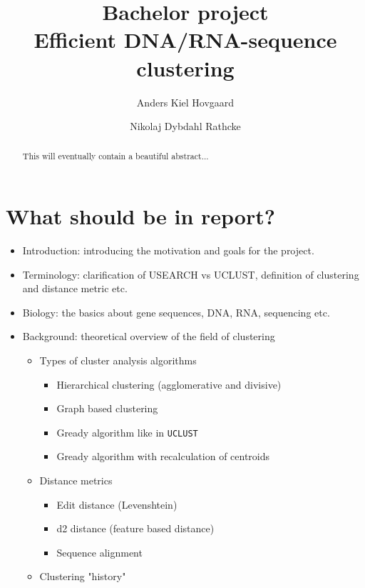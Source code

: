 \documentclass[11pt,a4paper]{article}
\title{Bachelor project \\
       \vspace{2mm}
       {\LARGE Efficient DNA/RNA-sequence clustering}}
\author{Anders Kiel Hovgaard \and Nikolaj Dybdahl Rathcke}
\begin{document}
\maketitle
\thispagestyle{fancy}

\begin{abstract}
  This will eventually contain a beautiful abstract...
\end{abstract}

\section{What should be in report?}

\begin{itemize}
  \item Introduction: introducing the motivation and goals for the project.
    
  \item Terminology: clarification of USEARCH vs UCLUST, definition of
    clustering and distance metric etc.

  \item Biology: the basics about gene sequences, DNA, RNA, sequencing etc.

  \item Background: theoretical overview of the field of clustering
    \begin{itemize}
      \item Types of cluster analysis algorithms
        \begin{itemize}
          \item Hierarchical clustering (agglomerative and divisive)
          \item Graph based clustering
          \item Gready algorithm like in \texttt{UCLUST}
          \item Gready algorithm with recalculation of centroids
        \end{itemize}

      \item Distance metrics
        \begin{itemize}
          \item Edit distance (Levenshtein)
          \item d2 distance (feature based distance)
          \item Sequence alignment
        \end{itemize}

      \item Clustering "history"
    \end{itemize}


\end{itemize}
\end{document}
